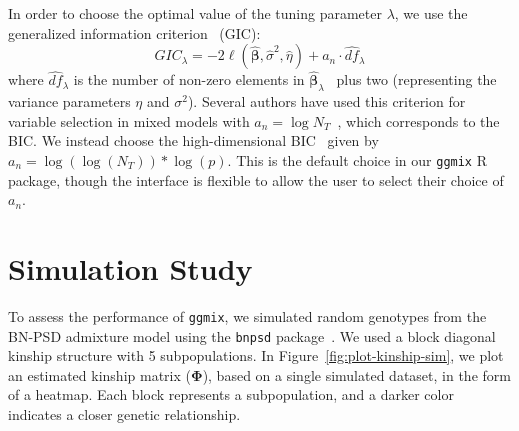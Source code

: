 \documentclass[12pt,letter]{article}\usepackage[]{graphicx}\usepackage[]{color}
\newcommand{\bbeta}{\boldsymbol{\beta}}
\newcommand{\bPhi}{\boldsymbol{\Phi}}
\begin{document}
In order to choose the optimal value of the tuning parameter $\lambda$, we use the generalized information criterion~\citep{nishii1984asymptotic} (GIC):
\begin{equation}
	GIC_{\lambda} = -2 \ell(\widehat{\bbeta}, \widehat{\sigma}^2, \widehat{\eta}) + a_n \cdot \widehat{df}_{\lambda}
\end{equation}
where $\widehat{df}_{\lambda}$ is the number of non-zero elements in $\widehat{\bbeta}_{\lambda}$~\citep{zou2007degrees} plus two (representing the variance parameters $\eta$ and $\sigma^2$). Several authors have used this criterion for variable selection in mixed models with $a_n = \log N_T$~\citep{bondell2010joint,schelldorfer2011estimation}, which corresponds to the BIC. We instead choose the high-dimensional BIC~\citep{fan2013tuning} given by $a_n = \log(\log(N_T)) * \log(p)$. This is the default choice in our \texttt{ggmix} R package, though the interface is flexible to allow the user to select their choice of $a_n$.



\section{Simulation Study} \label{simustudy}

To assess the performance of \texttt{ggmix}, we simulated random genotypes from the BN-PSD admixture model using the \texttt{bnpsd} package~\citep{bnpsd1,bnpsd2}.
We used a block diagonal kinship structure with 5 subpopulations.
In Figure~\ref{fig:plot-kinship-sim}, we plot an estimated kinship matrix  ($\bPhi$), based on a single simulated dataset, in the form of a heatmap.
Each block represents a subpopulation, and a darker color indicates a closer genetic relationship.
\end{document}
